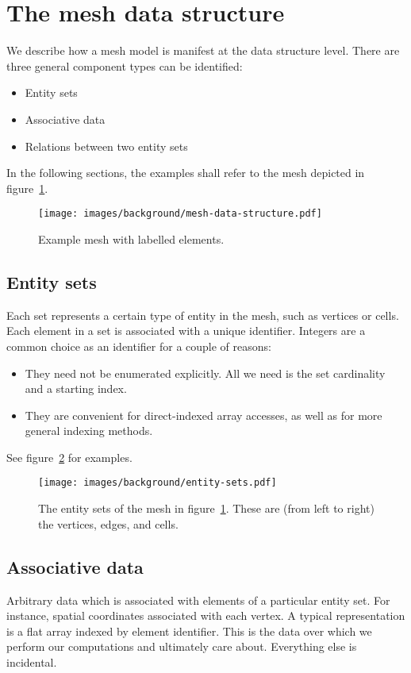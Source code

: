 \section{The mesh data structure}

We describe how a mesh model is manifest at the data structure level. There are three general component types can be identified:
\begin{itemize}
\item Entity sets
\item Associative data
\item Relations between two entity sets
\end{itemize}

In the following sections, the examples shall refer to the mesh depicted in figure~\ref{fig:example-mesh}.

\begin{figure}
    \texttt{[image: images/background/mesh-data-structure.pdf]}
    \caption{Example mesh with labelled elements.}
    \label{fig:example-mesh}
\end{figure}


\subsection{Entity sets}
Each set represents a certain type of entity in the mesh, such as vertices or cells. Each element in a set is associated with a unique identifier. Integers are a common choice as an identifier for a couple of reasons:
\begin{itemize}
\item They need not be enumerated explicitly. All we need is the set cardinality and a starting index.
\item They are convenient for direct-indexed array accesses, as well as for more general indexing methods.
\end{itemize}

See figure~\ref{fig:entity-sets} for examples.

\begin{figure}
    \texttt{[image: images/background/entity-sets.pdf]}
    \caption{The entity sets of the mesh in figure~\ref{fig:example-mesh}. These are (from left to right) the vertices, edges, and cells.}
    \label{fig:entity-sets}
\end{figure}


\subsection{Associative data}
Arbitrary data which is associated with elements of a particular entity set. For instance, spatial coordinates associated with each vertex. A typical representation is a flat array indexed by element identifier.
This is the data over which we perform our computations and ultimately care about. Everything else is incidental.


